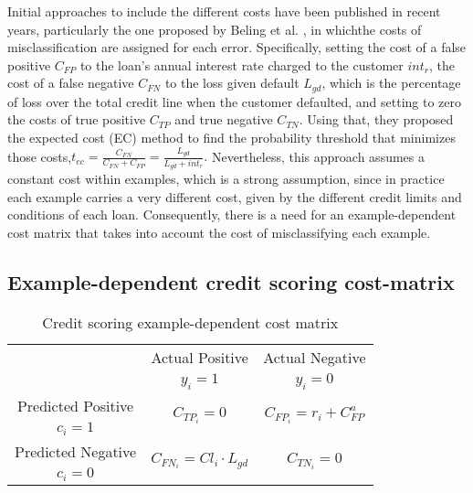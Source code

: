   Initial approaches to include the different costs have been published in recent years, 
  particularly the one proposed by Beling et al. \citep{Beling2005,Oliver2009}, in whichthe costs 
of 
  misclassification are assigned for each error. Specifically, setting the cost of a false positive 
  $C_{FP}$ to the loan's annual interest rate charged to the customer $int_r$, the cost of a false 
  negative $C_{FN}$ to the loss given default $L_{gd}$, which is the percentage of loss over the 
  total credit line when the customer defaulted, and setting to zero the costs of true positive 
  $C_{TP}$ and true negative $C_{TN}$. Using that, they proposed the expected cost (EC) method to 
  find the probability threshold that minimizes those costs,$t_{ec}= \frac{C_{FN}}{C_{FN}+C_{FP}} 
  =\frac{L_{gd}}{L_{gd}+int_r}.$ Nevertheless, this approach assumes a constant cost within 
  examples, which is a strong assumption, since in practice each example carries a very 
  different cost, given by the different credit limits and conditions of each loan. Consequently, 
  there is a need for an example-dependent cost matrix that takes into account the cost of 
  misclassifying each example.

	\subsection{Example-dependent credit scoring cost-matrix}
	\begin{table}
  \caption{Credit scoring example-dependent cost matrix}\label{table_costmat2}
    \centering
    \begin{tabular}{c|c|c}
      \multicolumn{1}{c|}{}  & Actual Positive& Actual Negative \\
      \multicolumn{1}{c|}{} & $y_i=1$& $y_i=0$ \\
      \hline
      Predicted Positive& \multirow{ 2}{*}{$C_{TP_i}=0$} & \multirow{2}{*}{$C_{FP_i}=r_i+C^a_{FP}$} 
      \\
      $c_i=1$ & &\\
      \hline
      Predicted Negative& \multirow{ 2}{*}{$C_{FN_i}=Cl_i \cdot L_{gd}$} & \multirow{
      2}{*}{$C_{TN_i}=0$} \\
      $c_i=0$ & &\\
    \end{tabular}
  \end{table}
    

